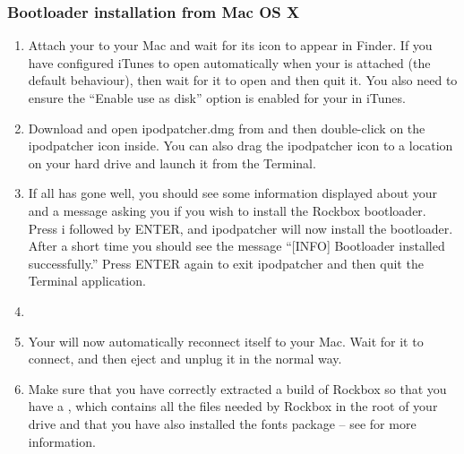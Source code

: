 \subsubsection{Bootloader installation from Mac OS X}

\begin{enumerate}

\item Attach your \dap{} to your Mac and wait for its icon to appear in 
Finder. If you have configured iTunes to open automatically when your
\dap{} is attached (the default behaviour), then wait for it to open and
then quit it. You also need to ensure the ``Enable use as disk'' option
is enabled for your \dap{} in iTunes.

\item Download and open ipodpatcher.dmg from 
and then double-click on the ipodpatcher icon inside. You can also
drag the ipodpatcher icon to a location on your hard drive and launch
it from the Terminal.

\item If all has gone well, you should see some 
information displayed about your \dap{} and a message asking you if you 
wish to install the Rockbox bootloader. Press i followed by ENTER, and 
ipodpatcher will now install the bootloader. After a short time you 
should see the message ``[INFO] Bootloader installed successfully.'' Press 
ENTER again to exit ipodpatcher and then quit the Terminal application.

\item {}


\item Your \dap{} will now automatically reconnect itself to your Mac. 
Wait for it to connect, and then eject and unplug it in the normal way. 

\item Make sure that you have correctly extracted a build of Rockbox so that
you have a , which contains all the files needed by Rockbox
in the root of your \daps{} drive and that you have also installed the fonts
package -- see  for more information.

\end{enumerate}

